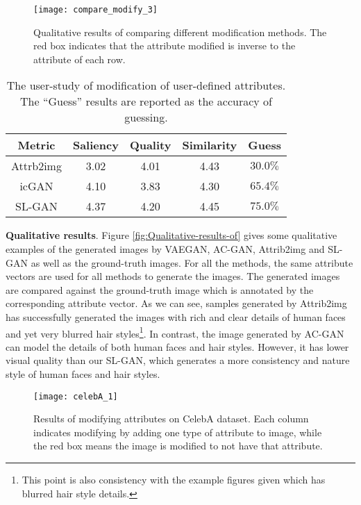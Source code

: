 \documentclass[10pt,letterpaper,twocolumn]{article}
\providecommand{\tabularnewline}{\\}
\begin{document}
\begin{figure*}
\centering{}\texttt{[image: compare\_modify\_3]}\caption{\label{fig:Qualitative-results-of-modification}Qualitative results
of comparing different modification methods. The red box indicates
that the attribute modified is inverse to the attribute of each row. }
\end{figure*}

\begin{table}
\begin{centering}
\begin{tabular}{|c|c|c|c|c|}
\hline 
Metric  & Saliency  & Quality  & Similarity  & Guess\tabularnewline
\hline 
\hline 
Attrb2img  & 3.02  & 4.01  & 4.43  & $30.0\%$\tabularnewline
\hline 
icGAN  & 4.10  & 3.83  & 4.30  & $65.4\%$\tabularnewline
\hline 
SL-GAN  & 4.37  & 4.20  & 4.45  & $75.0\%$\tabularnewline
\hline 
\end{tabular}
\par\end{centering}
\caption{\label{tab:The-user-study-of}The user-study of modification of user-defined
attributes. The ``Guess'' results are reported as the accuracy of
guessing.}
\end{table}

\noindent \textbf{Qualitative results}. Figure \ref{fig:Qualitative-results-of}
gives some qualitative examples of the generated images by VAEGAN,
AC-GAN, Attrib2img and SL-GAN as well as the ground-truth images.
For all the methods, the same attribute vectors are used for all methods
to generate the images. The generated images are compared against
the ground-truth image which is annotated by the corresponding attribute
vector. As we can see, samples generated by Attrib2img has successfully
generated the images with rich and clear details of human faces and
yet very blurred hair styles\footnote{This point is also consistency with the example figures given \cite{yan2016eccv}
which has blurred hair style details.}. In contrast, the image generated by AC-GAN can model the details
of both human faces and hair styles. However, it has lower visual
quality than our SL-GAN, which generates a more consistency and nature
style of human faces and hair styles.

\begin{figure*}
\begin{centering}
\texttt{[image: celebA\_1]} 
\par\end{centering}
\caption{\label{fig:Results-of-celebA}Results of modifying attributes on CelebA
dataset. Each column indicates modifying by adding one type of attribute
to image, while the red box means the image is modified to not have
that attribute. }
\vspace{-0.1in}
 
\end{figure*}
\end{document}
